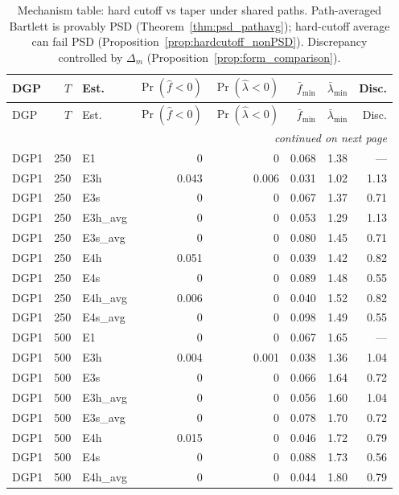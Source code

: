 \begin{scriptsize}\setlength{\tabcolsep}{3pt}
\begin{longtable}{lrl*{5}{r}}
\caption{Mechanism table: hard cutoff vs taper under shared paths. Path-averaged Bartlett is provably PSD (Theorem~\ref{thm:psd_pathavg}); hard-cutoff average can fail PSD (Proposition~\ref{prop:hardcutoff_nonPSD}). Discrepancy controlled by $\Delta_m$ (Proposition~\ref{prop:form_comparison}).}
\label{tab:mc_mechanism}\\
\toprule
DGP & $T$ & Est. & $\Pr(\hat f\!<\!0)$ & $\Pr(\hat\lambda\!<\!0)$ & $\bar{f}_{\min}$ & $\bar{\lambda}_{\min}$ & Disc. \\
\midrule
\endfirsthead
\toprule
DGP & $T$ & Est. & $\Pr(\hat f\!<\!0)$ & $\Pr(\hat\lambda\!<\!0)$ & $\bar{f}_{\min}$ & $\bar{\lambda}_{\min}$ & Disc. \\
\midrule
\endhead
\midrule
\multicolumn{8}{r}{\emph{continued on next page}}\\
\endfoot
\bottomrule
\endlastfoot
DGP1 & 250 & E1 & 0 & 0 & 0.068 & 1.38 & --- \\
DGP1 & 250 & E3h & 0.043 & 0.006 & 0.031 & 1.02 & 1.13 \\
DGP1 & 250 & E3s & 0 & 0 & 0.067 & 1.37 & 0.71 \\
DGP1 & 250 & E3h\_avg & 0 & 0 & 0.053 & 1.29 & 1.13 \\
DGP1 & 250 & E3s\_avg & 0 & 0 & 0.080 & 1.45 & 0.71 \\
DGP1 & 250 & E4h & 0.051 & 0 & 0.039 & 1.42 & 0.82 \\
DGP1 & 250 & E4s & 0 & 0 & 0.089 & 1.48 & 0.55 \\
DGP1 & 250 & E4h\_avg & 0.006 & 0 & 0.040 & 1.52 & 0.82 \\
DGP1 & 250 & E4s\_avg & 0 & 0 & 0.098 & 1.49 & 0.55 \\
\addlinespace
DGP1 & 500 & E1 & 0 & 0 & 0.067 & 1.65 & --- \\
DGP1 & 500 & E3h & 0.004 & 0.001 & 0.038 & 1.36 & 1.04 \\
DGP1 & 500 & E3s & 0 & 0 & 0.066 & 1.64 & 0.72 \\
DGP1 & 500 & E3h\_avg & 0 & 0 & 0.056 & 1.60 & 1.04 \\
DGP1 & 500 & E3s\_avg & 0 & 0 & 0.078 & 1.70 & 0.72 \\
DGP1 & 500 & E4h & 0.015 & 0 & 0.046 & 1.72 & 0.79 \\
DGP1 & 500 & E4s & 0 & 0 & 0.088 & 1.73 & 0.56 \\
DGP1 & 500 & E4h\_avg & 0 & 0 & 0.044 & 1.80 & 0.79 \\

\end{longtable}
\end{scriptsize}

